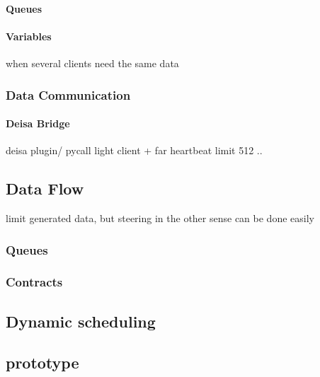 \paragraph{Queues} 

\paragraph{Variables}
when several clients need the same data 

\subsubsection{Data Communication}\label{sec:DandCcomm:data}
\paragraph{Deisa Bridge}
deisa plugin/ pycall
light client + far heartbeat 
limit 512 ..




\subsection{Data Flow}
limit generated data, but steering in the other sense can be done easily  
\subsubsection{Queues}
\subsubsection{Contracts}

\subsection{Dynamic scheduling}






\subsection{\deisa prototype}
\cite{deisa}

